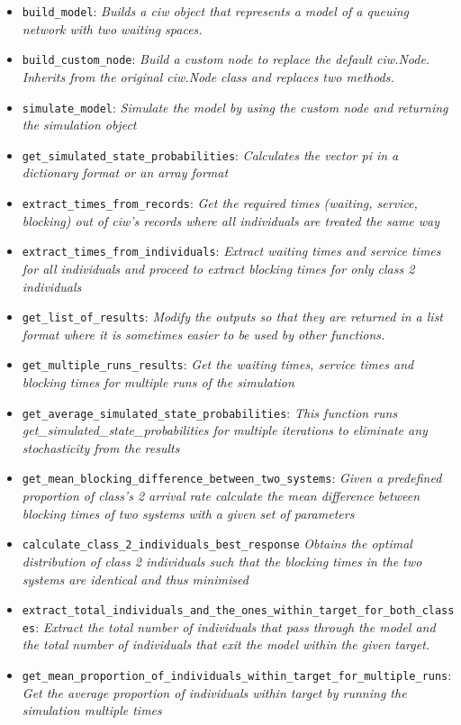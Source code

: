 \begin{itemize}
    \item \lstinline[style=pystyle]{build_model}: \textit{Builds a ciw object 
    that represents a model of a queuing network with two waiting spaces.}
    \item \lstinline[style=pystyle]{build_custom_node}: \textit{Build a custom 
    node to replace the default ciw.Node. Inherits from the original ciw.Node 
    class and replaces two methods.}
    \item \lstinline[style=pystyle]{simulate_model}: \textit{Simulate the model
    by using the custom node and returning the simulation object}
    \item \lstinline[style=pystyle]{get_simulated_state_probabilities}: \textit{
    Calculates the vector pi in a dictionary format or an array format}
    \item \lstinline[style=pystyle]{extract_times_from_records}: \textit{Get the
    required times (waiting, service, blocking) out of ciw's records where all 
    individuals are treated the same way}
    \item \lstinline[style=pystyle]{extract_times_from_individuals}: \textit{
    Extract waiting times and service times for all individuals and proceed to 
    extract blocking times for only class 2 individuals}
    \item \lstinline[style=pystyle]{get_list_of_results}: \textit{Modify the 
    outputs so that they are returned in a list format where it is sometimes 
    easier to be used by other functions.}
    \item \lstinline[style=pystyle]{get_multiple_runs_results}: \textit{Get the 
    waiting times, service times and blocking times for multiple runs of the 
    simulation}
    \item \lstinline[style=pystyle]{get_average_simulated_state_probabilities}:
    \textit{This function runs \hfill\break
    get\_simulated\_state\_probabilities for multiple iterations to eliminate 
    any stochasticity from the results}
    \item \lstinline[style=pystyle]
    {get_mean_blocking_difference_between_two_systems}: \textit{Given a 
    predefined proportion of class's 2 arrival rate calculate the mean 
    difference between blocking times of two systems with a given set of 
    parameters}
    \item \lstinline[style=pystyle]{calculate_class_2_individuals_best_response}
    \textit{Obtains the optimal distribution of class 2 individuals such that 
    the blocking times in the two systems are identical and thus minimised}
    \item \lstinline[style=pystyle]
    {extract_total_individuals_and_the_ones_within_target_for_both_classes}:
    \hfill\break \textit{Extract the total number of individuals that pass 
    through the model and the total number of individuals that exit the model 
    within the given target.}
    \item \lstinline[style=pystyle]
    {get_mean_proportion_of_individuals_within_target_for_multiple_runs}: 
    \textit{Get the average proportion of individuals within target by running 
    the simulation multiple times}
\end{itemize}

